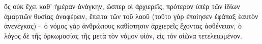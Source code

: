 \documentclass{openreader}
\begin{document}
ὃς οὐκ ἔχει καθ’ ἡμέραν ἀνάγκην, ὥσπερ οἱ ἀρχιερεῖς, πρότερον ὑπὲρ τῶν ἰδίων ἁμαρτιῶν θυσίας ἀναφέρειν, ἔπειτα τῶν τοῦ λαοῦ (τοῦτο γὰρ ἐποίησεν ἐφάπαξ ἑαυτὸν ἀνενέγκας)· 
ὁ νόμος γὰρ ἀνθρώπους καθίστησιν ἀρχιερεῖς ἔχοντας ἀσθένειαν, ὁ λόγος δὲ τῆς ὁρκωμοσίας τῆς μετὰ τὸν νόμον υἱόν, εἰς τὸν αἰῶνα τετελειωμένον. 
\end{document}
